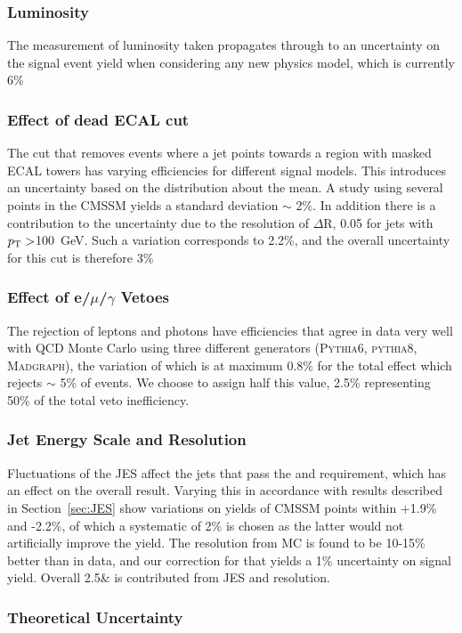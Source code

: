 \subsubsection{Luminosity}
The measurement of luminosity taken propagates through to an uncertainty on the signal event yield when considering any new physics model, which is currently 6\%~\cite{EWK-11-001}
\subsubsection{Effect of dead ECAL cut}
The cut that removes events where a jet points towards a region with masked ECAL towers has varying efficiencies for different signal models. This introduces an uncertainty based on the distribution about the mean. A study using several points in the CMSSM yields a standard deviation $\sim$ 2\%. In addition there is a contribution to the uncertainty due to the resolution of $\Delta$R, 0.05 for jets with ${p_{\text T}} >$100~GeV. Such a variation corresponds to 2.2\%, and the overall uncertainty for this cut is therefore 3\%
\subsubsection{Effect of e/$\mu$/$\gamma$ Vetoes}
The rejection of leptons and photons have efficiencies that agree in data very well with QCD Monte Carlo using three different generators (\textsc{Pythia6, pythia8, Madgraph}), the variation of which is at maximum 0.8\% for the total effect which rejects $\sim$ 5\% of events. We choose to assign half this value, 2.5\% representing 50\% of the total veto inefficiency.

\subsubsection{Jet Energy Scale and Resolution}
Fluctuations of the JES affect the jets that pass the \Pt and \HT requirement, which has an effect on the overall result. Varying this in accordance with results described in Section~\ref{sec:JES} show variations on yields of CMSSM points within +1.9\% and -2.2\%, of which a systematic of 2\% is chosen as the latter would not artificially improve the yield. The resolution from MC is found to be 10-15\% better than in data, and our correction for that yields a 1\% uncertainty on signal yield. Overall 2.5\& is contributed from JES and resolution.

\subsubsection{Theoretical Uncertainty}

